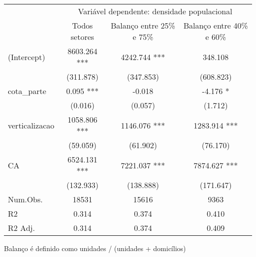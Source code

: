 \setlength{\LTpost}{0mm}
\begin{longtable}{lccc}
\toprule
 & \multicolumn{3}{c}{Variável dependente: densidade populacional} \\ 
\cmidrule(lr){2-4}
  & Todos setores & Balanço entre 25\% e 75\% & Balanço entre 40\% e 60\% \\ 
\midrule\addlinespace[2.5pt]
(Intercept) & 8603.264 *** & 4242.744 *** & 348.108 \\ 
 & (311.878) & (347.853) & (608.823) \\ 
cota\_parte & 0.095 *** & -0.018 & -4.176 * \\ 
 & (0.016) & (0.057) & (1.712) \\ 
verticalizacao & 1058.806 *** & 1146.076 *** & 1283.914 *** \\ 
 & (59.059) & (61.902) & (76.170) \\ 
CA & 6524.131 *** & 7221.037 *** & 7874.627 *** \\ 
 & (132.933) & (138.888) & (171.647) \\ 
Num.Obs. & 18531 & 15616 & 9363 \\ 
R2 & 0.314 & 0.374 & 0.410 \\ 
R2 Adj. & 0.314 & 0.374 & 0.409 \\ 
\bottomrule
\end{longtable}
\begin{minipage}{\linewidth}
Balanço é definido como unidades / (unidades + domicílios)\\
\end{minipage}


